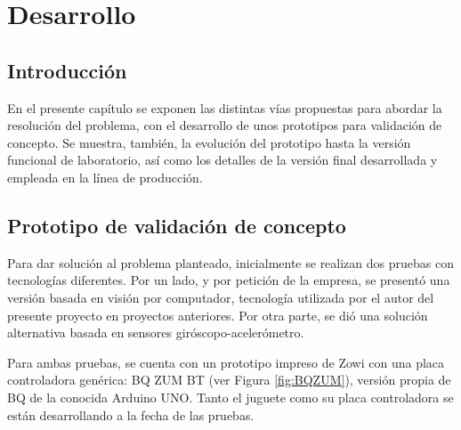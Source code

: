 

\chapter{Desarrollo} %

\label{Chapter3} %


\section{Introducción}

En el presente capítulo se exponen las distintas vías propuestas para abordar la resolución del problema, con el desarrollo de unos prototipos para validación de concepto. Se muestra, también, la evolución del prototipo hasta la versión funcional de laboratorio, así como los detalles de la versión final desarrollada y empleada en la línea de producción.


\section{Prototipo de validación de concepto}

Para dar solución al problema planteado, inicialmente se realizan dos pruebas con tecnologías diferentes. Por un lado, y por petición de la empresa, se presentó una versión basada en visión por computador, tecnología utilizada por el autor del presente proyecto en proyectos anteriores. Por otra parte, se dió una solución alternativa basada en sensores giróscopo-acelerómetro.

Para ambas pruebas, se cuenta con un prototipo impreso de Zowi con una placa controladora genérica: BQ ZUM BT (ver Figura \ref{fig:BQZUM}), versión propia de BQ de la conocida Arduino UNO. Tanto el juguete como su placa controladora se están desarrollando a la fecha de las pruebas.

